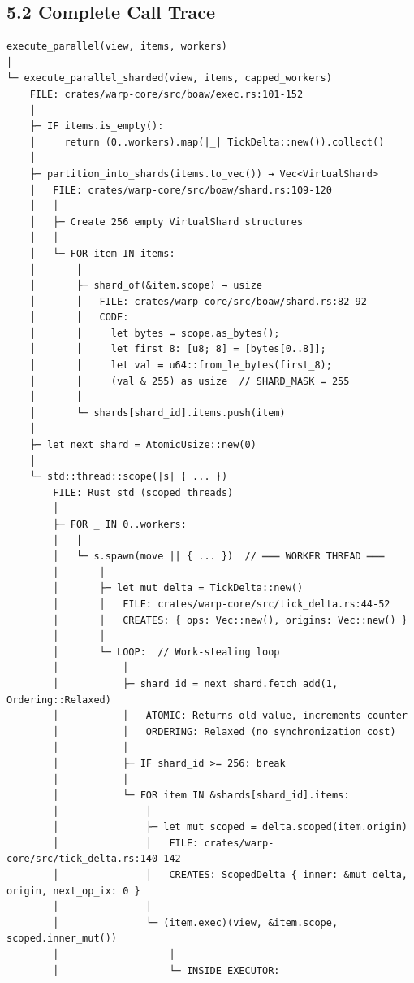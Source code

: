 \documentclass[
]{book}
\begin{document}
\subsection{5.2 Complete Call Trace}\label{complete-call-trace-2}

\begin{verbatim}
execute_parallel(view, items, workers)
│
└─ execute_parallel_sharded(view, items, capped_workers)
    FILE: crates/warp-core/src/boaw/exec.rs:101-152
    │
    ├─ IF items.is_empty():
    │     return (0..workers).map(|_| TickDelta::new()).collect()
    │
    ├─ partition_into_shards(items.to_vec()) → Vec<VirtualShard>
    │   FILE: crates/warp-core/src/boaw/shard.rs:109-120
    │   │
    │   ├─ Create 256 empty VirtualShard structures
    │   │
    │   └─ FOR item IN items:
    │       │
    │       ├─ shard_of(&item.scope) → usize
    │       │   FILE: crates/warp-core/src/boaw/shard.rs:82-92
    │       │   CODE:
    │       │     let bytes = scope.as_bytes();
    │       │     let first_8: [u8; 8] = [bytes[0..8]];
    │       │     let val = u64::from_le_bytes(first_8);
    │       │     (val & 255) as usize  // SHARD_MASK = 255
    │       │
    │       └─ shards[shard_id].items.push(item)
    │
    ├─ let next_shard = AtomicUsize::new(0)
    │
    └─ std::thread::scope(|s| { ... })
        FILE: Rust std (scoped threads)
        │
        ├─ FOR _ IN 0..workers:
        │   │
        │   └─ s.spawn(move || { ... })  // ═══ WORKER THREAD ═══
        │       │
        │       ├─ let mut delta = TickDelta::new()
        │       │   FILE: crates/warp-core/src/tick_delta.rs:44-52
        │       │   CREATES: { ops: Vec::new(), origins: Vec::new() }
        │       │
        │       └─ LOOP:  // Work-stealing loop
        │           │
        │           ├─ shard_id = next_shard.fetch_add(1, Ordering::Relaxed)
        │           │   ATOMIC: Returns old value, increments counter
        │           │   ORDERING: Relaxed (no synchronization cost)
        │           │
        │           ├─ IF shard_id >= 256: break
        │           │
        │           └─ FOR item IN &shards[shard_id].items:
        │               │
        │               ├─ let mut scoped = delta.scoped(item.origin)
        │               │   FILE: crates/warp-core/src/tick_delta.rs:140-142
        │               │   CREATES: ScopedDelta { inner: &mut delta, origin, next_op_ix: 0 }
        │               │
        │               └─ (item.exec)(view, &item.scope, scoped.inner_mut())
        │                   │
        │                   └─ INSIDE EXECUTOR:

\end{verbatim}
\end{document}
